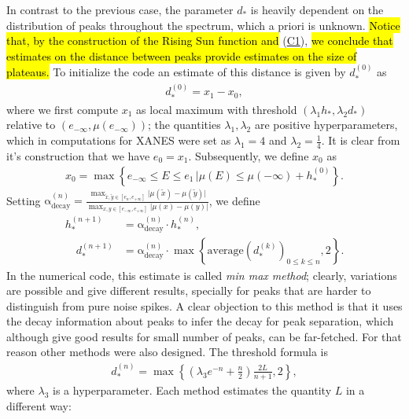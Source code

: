 \documentclass[%
 reprint,
 amsmath,amssymb,
 aps,
]{revtex4-1}
\begin{document}
In contrast to the previous case, the parameter  $d_*$ is heavily dependent on the distribution of peaks throughout the spectrum, which a priori is unknown. \hl{Notice that, by the construction of the Rising Sun function and} (\hyperref[C1]{C1}), \hl{we conclude that estimates on the distance between peaks provide estimates on the size of plateaus.} To initialize the code an estimate of this  distance is given by $d_*^{(0)}$ as%
%
\begin{align}\label{estimate_d_0}
d_*^{(0)} = x_{1} - x_{0}, 
\end{align}
%
where we first compute $x_1$ as local maximum with threshold $(\lambda_1 h_*,\lambda_2 d_*)$ relative to $(e_{-\infty},\mu(e_{-\infty}))$; the quantities $\lambda_{1},\lambda_{2}$ are positive hyperparameters, which in computations for XANES were set as $\lambda_1=4$ and $\lambda_2=\frac{1}{4}$. It is clear from it's construction that we have $e_0 = x_1$.
%
Subsequently, we define $x_{0}$ as
%
\begin{align}
x_{0} = \max \left\{e_{-\infty}\leq E\leq e_{1} \,\Big|  \mu(E)  \leq \mu(-\infty) +h^{(0)}_* \right\}.
\end{align}
%
Setting $\mathrm{\alpha}_{\text{decay}}^{(n)}=\frac{\max_{\tilde{x},\tilde{y} \in[e_{n},e_{+\infty}]}{\vert \mu(\tilde{x}) - \mu(\tilde{y}) \vert}}{\max_{x,y \in[e_{-\infty},e_{+\infty}]}{\vert \mu(x) - \mu(y) \vert}}$, we define 
\begin{align*}
%
h_*^{(n+1)} &= \mathrm{\alpha}_{\text{decay}}^{(n)}\cdot h_*^{(n)},\\
\quad d_*^{(n+1)} &= \mathrm{\alpha}_{\text{decay}}^{(n)}\cdot \max\left\{\text{average}\left(d_*^{(k)}\right)_{0\leq k \leq n},2\right\}.
\end{align*}
%
%
\noindent
In the numerical code, this estimate is called \textit{min max method}; clearly, variations are possible and give different results, specially for peaks that are harder to distinguish from pure noise spikes. A clear objection to this method is that it uses the decay information about peaks to infer the decay for peak separation, which although give good results for small number of peaks, can be   far-fetched. For that reason other methods were also designed. The threshold formula is 
 \begin{align}\label{exponential_regression}
  d_*^{(n)} = \max\left\{\left(\lambda_3 e^{-n} + \frac{n}{2} \right)\frac{2L}{n+1}, 2\right\},
 \end{align}
%
 where $\lambda_3$ is a hyperparameter. Each method estimates the quantity $L$ in a different way:
\end{document}
